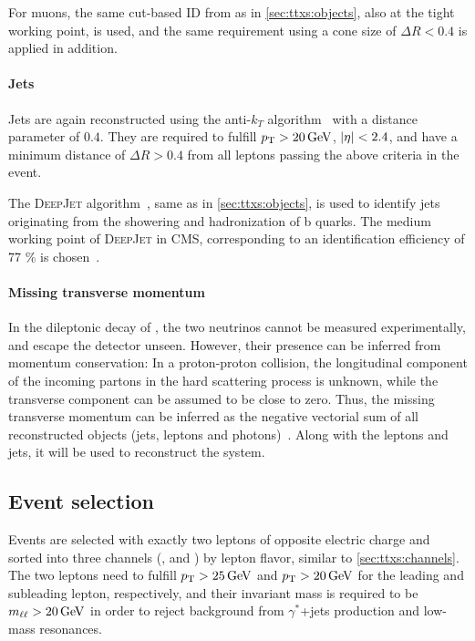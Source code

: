 For muons, the same cut-based ID from  as in \cref{sec:ttxs:objects}, also at the tight working point, is used, and the same \Irel requirement using a cone size of $\Delta R < 0.4$ is applied in addition.

\paragraph{Jets} 

Jets are again reconstructed using the anti-$k_T$ algorithm~\cite{Cacciari:2008gp} with a distance parameter of $0.4$. They are required to fulfill $\pt > \SI{20}{\GeV}$, $|\eta| < 2.4$, and have a minimum distance of $\Delta R > 0.4$ from all leptons passing the above criteria in the event.

The \textsc{DeepJet} algorithm~\cite{DeepJet:2020}, same as in \cref{sec:ttxs:objects}, is used to identify jets originating from the showering and hadronization of b quarks. The medium working point of \textsc{DeepJet} in CMS, corresponding to an identification efficiency of 77 \% is chosen~\cite{CMS:BTV-16-002}.

\paragraph{Missing transverse momentum}

In the dileptonic decay of \ttbar, the two neutrinos cannot be measured experimentally, and escape the detector unseen. However, their presence can be inferred from momentum conservation: In a proton-proton collision, the longitudinal component of the incoming partons in the hard scattering process is unknown, while the transverse component can be assumed to be close to zero. Thus, the missing transverse momentum \ptmissvec can be inferred as the negative vectorial sum of all reconstructed objects (jets, leptons and photons)~\cite{CMS:JME-17-001}. Along with the leptons and jets, it will be used to reconstruct the \ttbar system.

\subsection{Event selection}

Events are selected with exactly two leptons of opposite electric charge and sorted into three channels (\ee, \emu and \mumu) by lepton flavor, similar to \cref{sec:ttxs:channels}. The two leptons need to fulfill $\pt > \SI{25}{\GeV}$ and $\pt > \SI{20}{\GeV}$ for the leading and subleading lepton, respectively, and their invariant mass is required to be $\mll > \SI{20}{\GeV}$ in order to reject background from $\gamma^*$+jets production and low-mass resonances. 

